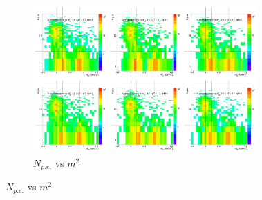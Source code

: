 \begin{figure}[H]
  \centering
    \begin{subfigure}{1\textwidth}
   \centering
   \includegraphics[width=0.94\textwidth]{hiptfits/pos/PSaccthreshold_cent0_ich1_accfire0_ptbin10.jpg}
    \caption{$N_{p.e.}$ vs $m^2$}
    \end{subfigure}
\end{figure}

